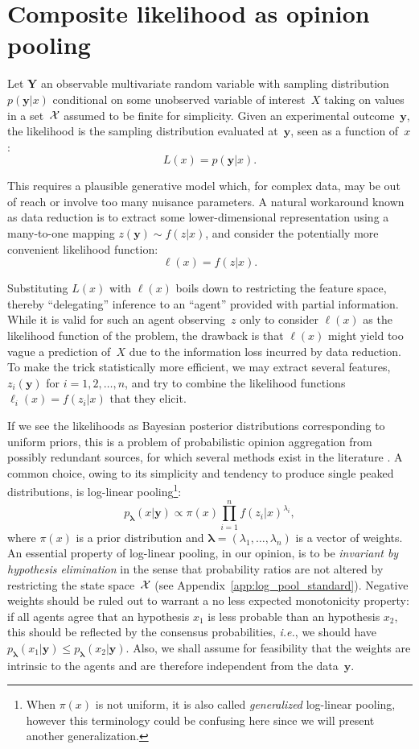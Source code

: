 \documentclass[english]{scrartcl}
\def\y{{\mathbf{y}}}
\newcommand{\blambda}{{\boldsymbol{\lambda}}}
\begin{document}
\section{Composite likelihood as opinion pooling}
\label{sec:log_pool}

Let $\mathbf{Y}$ an observable multivariate random variable with sampling distribution $p(\y|x)$ conditional on some unobserved variable of interest~$X$ taking on values in a set~${\cal X}$ assumed to be finite for simplicity. Given an experimental outcome~$\y$, the likelihood is the sampling distribution evaluated at~$\y$, seen as a function of~$x$:
$$
L(x) = p(\y|x).
$$

This requires a plausible generative model which, for complex data, may be out of reach or involve too many nuisance parameters. A natural workaround known as data reduction is to extract some lower-dimensional representation using a many-to-one mapping $z(\y)\sim f(z|x)$, and consider the potentially more convenient likelihood function:
$$
\ell(x) = f(z|x).
$$

Substituting $L(x)$ with $\ell(x)$ boils down to restricting the feature space, thereby  ``delegating'' inference to an ``agent'' provided with partial information. While it is valid for such an agent observing~$z$ only to consider $\ell(x)$ as the likelihood function of the problem, the drawback is that $\ell(x)$ might yield too vague a prediction of~$X$ due to the information loss incurred by data reduction. To make the trick statistically more efficient, we may extract several features, $z_i(\y)$ for $i=1,2,\ldots,n$, and try to combine the likelihood functions $\ell_i(x) = f(z_i|x)$ that they elicit.

If we see the likelihoods as Bayesian posterior distributions corresponding to uniform priors, this is a problem of probabilistic opinion aggregation from possibly redundant sources, for which several methods exist in the literature \cite{Tarantola-82,Genest-86,Garg-04,Allard-12}. A common choice, owing to its simplicity and tendency to produce single peaked distributions, is log-linear pooling\footnote{When $\pi(x)$ is not uniform, it is also called {\em generalized} log-linear pooling, however this terminology could be confusing here since we will present another generalization.}:
\begin{equation}
\label{eq:log_pool}
p_\blambda(x|\y) \propto \pi(x) \prod_{i=1}^n f(z_i|x)^{\lambda_i},
\end{equation} 
where $\pi(x)$ is a prior distribution and $\blambda=(\lambda_1,\ldots,\lambda_n)$ is a vector of weights. An essential property of log-linear pooling, in our opinion, is to be {\em invariant by hypothesis elimination} in the sense that  probability ratios are not altered by restricting the state space~${\cal X}$ (see Appendix~\ref{app:log_pool_standard}). Negative weights should be ruled out to warrant a no less expected monotonicity property: if all agents agree that an hypothesis $x_1$ is less probable than an hypothesis $x_2$, this should be reflected by the consensus probabilities, {\em i.e.}, we should have $p_\blambda(x_1|\y)\leq p_\blambda(x_2|\y)$. Also, we shall assume for feasibility that the weights are intrinsic to the agents and are therefore independent from the data~$\y$. 
\end{document}
